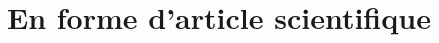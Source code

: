 \section{En forme d'article scientifique}

\begin{multicols}{2}
    \blindmathtrue
    \blindtext[10]
\end{multicols}